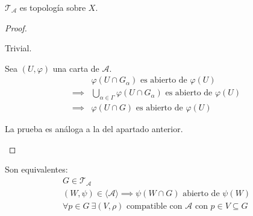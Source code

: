\documentclass[../VD.tex]{subfiles}
\begin{document}
\begin{lemma}
  \(\mathcal{T}_{\mathcal{A}}\) es topología sobre \(X\).
\end{lemma}

\begin{proof}\item
  \begin{subproof}
    Trivial.
  \end{subproof}

  \begin{subproof}
    Sea \((U,\varphi)\) una carta de \(\mathcal{A}\).
    \begin{align*}
      &\varphi(U \cap G_{\alpha}) \text{ es abierto de } \varphi(U)\\
      \implies & \bigcup_{\alpha \in \Gamma} \varphi(U \cap G_{\alpha}) \text{ es abierto de } \varphi(U)\\
      \implies & \varphi(U \cap G) \text{ es abierto de } \varphi(U)
    \end{align*}
  \end{subproof}

  \begin{subproof}[\(G_{1}, \dots, G_{n} \in \mathcal{T}_{\mathcal{A}} \implies
    \bigcap_{i = 1}^{n} G_{i} \in \mathcal{T}_{\mathcal{A}}\)]
    La prueba es análoga a la del apartado anterior.
  \end{subproof}
\end{proof}

\begin{lemma}
  \label{lem:topnat-caract}
  Son equivalentes:
  \begin{gather}
    \label{eq:topnat-caract-1}
    G \in \mathcal{T}_{\mathcal{A}}\\
    \label{eq:topnat-caract-2}
    (W, \psi) \in \langle \mathcal{A} \rangle \implies \psi(W \cap G) \text{ abierto
      de } \psi(W)\\
    \label{eq:topnat-caract-3}
    \forall p \in G \  \exists (V,\rho) \text{ compatible con } \mathcal{A}
    \text{ con } p \in V \subseteq G
  \end{gather}
\end{lemma}
\end{document}
